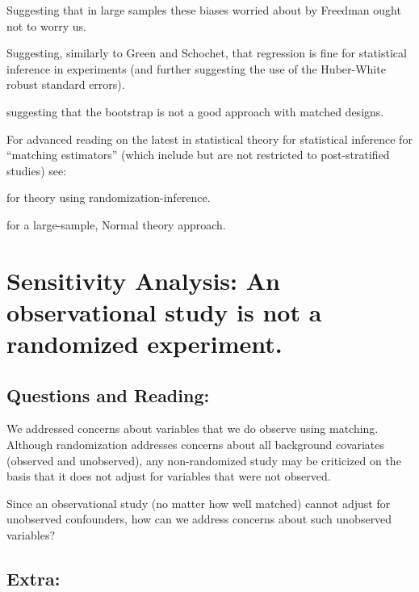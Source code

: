 \documentclass[10pt, letterpaper]{article}
\begin{document}
\cite{schochet2009regression,green2009ec} Suggesting that in large
samples these biases worried about by Freedman ought not to worry
us. 

\citealp[Chap 6--8]{imbens2009causal} Suggesting, similarly to Green and
Schochet, that regression is fine for statistical inference in
experiments (and further suggesting the use of the Huber-White robust
standard errors).

\citealp{AbadImbe:2004:On-t} suggesting that the bootstrap is not a good
approach with matched designs.

For advanced reading on the latest in statistical theory for
statistical inference for ``matching estimators'' (which include but
are not restricted to post-stratified studies) see:

\cite{hansen2009prop} for theory using randomization-inference.

\cite{abadie2009matching} for a large-sample, Normal theory approach.


\AdvanceDate[1]
\section{Sensitivity Analysis: An observational study is not a randomized experiment.}

\subsection{Questions and Reading:}

We addressed concerns about variables that we do observe using matching.
Although randomization addresses concerns about all background covariates
(observed and unobserved), any non-randomized study may be criticized on the
basis that it does not adjust for variables that were not observed.

Since an observational study (no matter how well matched) cannot adjust for
unobserved confounders, how can we address concerns about such unobserved
variables?

\cite{cornfield:1959}

\cite{hosman2010}

\subsection{Extra:}

\citealp[Chap 4]{rosenbaum:2002}

\citealp[Chap 3, 14]{rosenbaum2010design}
\end{document}
